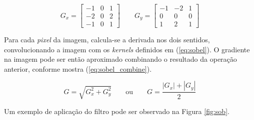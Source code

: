 \documentclass[10pt,a4paper]{article}
\newcommand{\pixel}{\textit{pixel} }
\newcommand{\kernels}{\textit{kernels} }
\begin{document}
\begin{equation}
  G_x =\left[\begin{array}{ccc}
    -1 & 0 & 1\\
    -2 & 0 & 2\\
    -1 & 0 & 1
  \end{array}\right] \qquad
  G_y =\left[\begin{array}{ccc}
    -1 & -2 & 1\\
     0 & 0 & 0\\
    1 & 2 & 1
  \end{array}\right]
  \label{eq:sobel}
\end{equation}

Para cada \pixel da imagem, calcula-se a derivada nos dois sentidos, convolucionando a imagem com os \kernels definidos em (\ref{eq:sobel}). O gradiente na imagem pode ser então aproximado combinando o resultado da operação anterior, conforme mostra (\ref{eq:sobel_combine}).

\begin{equation}
  G = \sqrt{G_x^2 + G_y^2} \qquad \text{ou} \qquad G = \frac{\left|G_x\right|+\left|G_y\right|}{2}
  \label{eq:sobel_combine}
\end{equation}

Um exemplo de aplicação do filtro pode ser observado na Figura \ref{fig:sob}.
\end{document}
